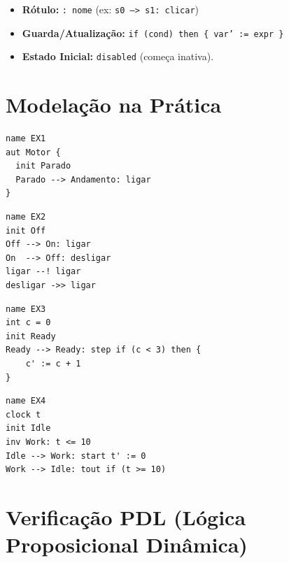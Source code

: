\documentclass[a4paper,11pt]{article}
\begin{document}
\begin{itemize}[noitemsep, topsep=0pt]
    \item \textbf{Rótulo:} \texttt{: nome} (ex: \texttt{s0 --> s1: clicar})
    \item \textbf{Guarda/Atualização:} \texttt{if (cond) then \{ var' := expr \}}
    \item \textbf{Estado Inicial:} \texttt{disabled} (começa inativa).
\end{itemize}


\section{Modelação na Prática}


\noindent
\begin{minipage}[t]{0.48\textwidth}
\begin{lstlisting}[caption={Modularidade e Escopo}]
name EX1
aut Motor {
  init Parado
  Parado --> Andamento: ligar
}
\end{lstlisting}
\end{minipage}
\hfill
\begin{minipage}[t]{0.48\textwidth}
\begin{lstlisting}[caption={Grafos Reativos}]
name EX2
init Off
Off --> On: ligar
On  --> Off: desligar
ligar --! ligar
desligar ->> ligar
\end{lstlisting}
\end{minipage}
\hfill
\begin{minipage}{0.48\textwidth}
\begin{lstlisting}[caption={Guardados}]
name EX3
int c = 0
init Ready
Ready --> Ready: step if (c < 3) then {
    c' := c + 1
}
\end{lstlisting}
\end{minipage}
\begin{minipage}{0.48\textwidth}
\begin{lstlisting}[caption={Temporizados}]
name EX4
clock t
init Idle
inv Work: t <= 10
Idle --> Work: start t' := 0
Work --> Idle: tout if (t >= 10)
\end{lstlisting}
\end{minipage}







\section{Verificação PDL (Lógica Proposicional Dinâmica)}
\end{document}
